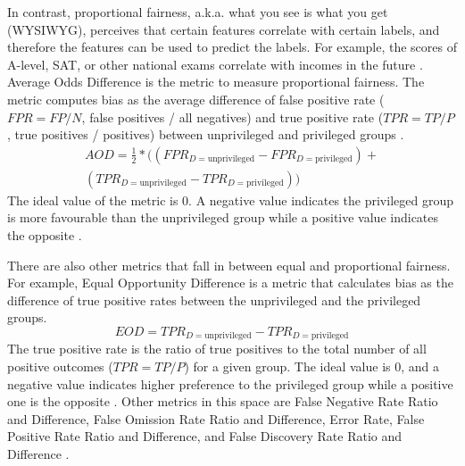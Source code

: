 \documentclass[sigconf,review]{acmart}
\begin{document}
In contrast, proportional fairness, a.k.a. what you see is what you get (WYSIWYG),  perceives that certain features correlate with certain labels, and therefore the features can be used to predict the labels. For example, the scores of A-level, SAT, or other national exams correlate with incomes in the future \cite{mahoney2020ai,ibmaif3602022guidance}. Average Odds Difference is the metric to measure proportional fairness. The metric computes bias as the average difference of false positive rate ($FPR = FP/N$, false positives / all negatives) and true positive rate ($TPR = TP/P$, true positives / positives) between unprivileged and privileged groups \cite{ibmaif3602022doc,bellamy2018ai}.
\begin{equation}
	\begin{aligned}
		AOD = \tfrac{1}{2}* ((FPR_{D = \text{unprivileged}} - FPR_{D = \text{privileged}}) +\\
		(TPR_{D = \text{unprivileged}} - TPR_{D = \text{privileged}}))
	\end{aligned}
\end{equation}
The ideal value of the metric is 0. A negative value indicates the privileged group is more favourable than the unprivileged group while a positive value indicates the opposite \cite{ibmaif3602022doc,bellamy2018ai}. 

There are also other metrics that fall in between equal and proportional fairness. For example, Equal Opportunity Difference \cite{ibmaif3602022doc,bellamy2018ai} is a metric that calculates bias as the difference of true positive rates between the unprivileged and the privileged groups. 
\begin{equation}
	EOD = TPR_{D = \text{unprivileged}} - TPR_{D = \text{privileged}}	
\end{equation}
The true positive rate is the ratio of true positives to the total number of all positive outcomes ($TPR=TP/P$) for a given group. The ideal value is 0, and a negative value indicates higher preference to the privileged group while a positive one is the opposite \cite{ibmaif3602022doc,bellamy2018ai}. Other metrics in this space are False Negative Rate Ratio and Difference, False Omission Rate Ratio and Difference, Error Rate, False Positive Rate Ratio and Difference, and False Discovery Rate Ratio and Difference \cite{mahoney2020ai,ibmaif3602022guidance}.

\end{document}
